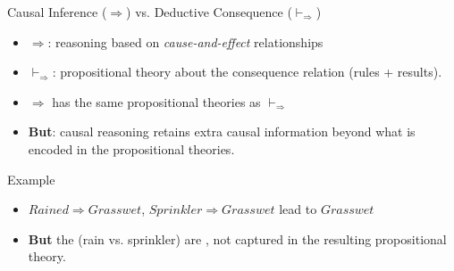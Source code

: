 \documentclass{beamer} %
\begin{document}
\begin{frame}{Causal Inference (\( \Rightarrow \)) vs. Deductive Consequence (\( \vdash_\Rightarrow \))}

    \begin{itemize}
        \item \textbf{\( \Rightarrow \)}: reasoning based on \emph{cause-and-effect} relationships
        \item \textbf{\( \vdash_\Rightarrow \)}: propositional theory about the consequence relation (rules + results).
        \item $\Rightarrow$ has the same propositional theories as \( \vdash_\Rightarrow \)
        \item \textbf{But}: causal reasoning retains extra causal information beyond what is encoded in the propositional theories.
    \end{itemize}

    \begin{exampleblock}{Example}
        \begin{itemize}
            \item $Rained \Rightarrow Grasswet$, $Sprinkler \Rightarrow Grasswet$ lead to $Grasswet$
            \item \textbf{But} the  (rain vs. sprinkler) are , not captured in the resulting propositional theory.
        \end{itemize}            
    \end{exampleblock}
\end{frame}
\end{document}
